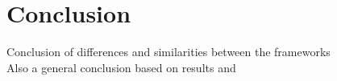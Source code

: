 \chapter{Conclusion}

Conclusion of differences and similarities between the frameworks\\

Also a general conclusion based on results and \cite{grzywaczewski2017training}